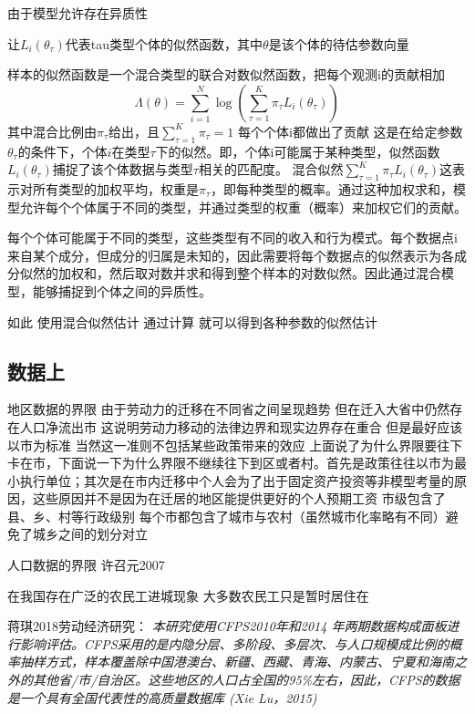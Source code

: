 \documentclass[a4paper,12pt]{article}
\begin{document}
由于模型允许存在异质性

让$L_{i}(\theta_{\tau})$代表tau类型个体的似然函数，其中$\theta$是该个体的待估参数向量

样本的似然函数是一个混合类型的联合对数似然函数，把每个观测i的贡献相加
\begin{equation}
\Lambda(\theta)=\sum\limits_{i=1}^{N}\log(\sum\limits_{\tau=1}^{K}\pi_{\tau}L_{i}(\theta_{\tau})) 
\end{equation}
其中混合比例由$\pi_{\tau}$给出，且$\sum\limits_{\tau=1}^{K}\pi_{\tau}=1$
每个个体i都做出了贡献
这是在给定参数$\theta_{\tau}$的条件下，个体$i$在类型$\tau$下的似然。即，个体i可能属于某种类型，似然函数
$L_i(\theta_{\tau})$捕捉了该个体数据与类型$\tau$相关的匹配度。
混合似然$\sum_{\tau=1}^{K} \pi_{\tau} L_i(\theta_{\tau})$这表示对所有类型的加权平均，权重是$\pi_{\tau}$，即每种类型的概率。通过这种加权求和，模型允许每个个体属于不同的类型，并通过类型的权重（概率）来加权它们的贡献。

每个个体可能属于不同的类型，这些类型有不同的收入和行为模式。每个数据点i来自某个成分，但成分的归属是未知的，因此需要将每个数据点的似然表示为各成分似然的加权和，然后取对数并求和得到整个样本的对数似然。因此通过混合模型，能够捕捉到个体之间的异质性。


如此
使用混合似然估计
通过计算
就可以得到各种参数的似然估计




\subsection{数据上}

地区数据的界限
由于劳动力的迁移在不同省之间呈现趋势 但在迁入大省中仍然存在人口净流出市 这说明劳动力移动的法律边界和现实边界存在重合 但是最好应该以市为标准 当然这一准则不包括某些政策带来的效应
上面说了为什么界限要往下卡在市，下面说一下为什么界限不继续往下到区或者村。首先是政策往往以市为最小执行单位；其次是在市内迁移中个人会为了出于固定资产投资等非模型考量的原因，这些原因并不是因为在迁居的地区能提供更好的个人预期工资
市级包含了县、乡、村等行政级别 每个市都包含了城市与农村（虽然城市化率略有不同）避免了城乡之间的划分对立


人口数据的界限
许召元2007

在我国存在广泛的农民工进城现象 大多数农民工只是暂时居住在


蒋琪2018劳动经济研究：
\textit{本研究使用CFPS2010年和2014 年两期数据构成面板进行影响评估。CFPS采用的是内隐分层、多阶段、多层次、与人口规模成比例的概率抽样方式，样本覆盖除中国港澳台、新疆、西藏、青海、内蒙古、宁夏和海南之外的其他省/市/自治区。这些地区的人口占全国的95\%左右，因此，CFPS的数据是一个具有全国代表性的高质量数据库 (Xie \＆ Lu，2015)}
\end{document}
